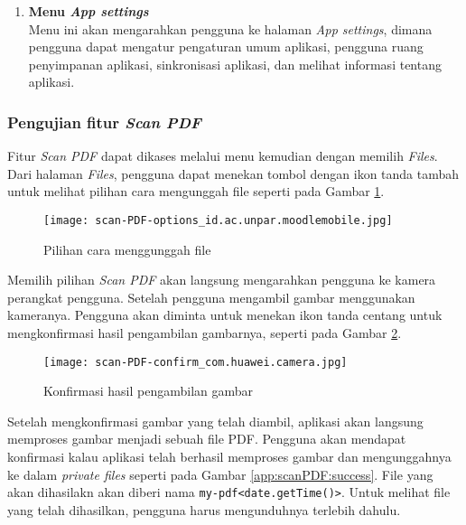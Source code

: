 \begin{enumerate}
\item \textbf{Menu \textit{App settings}} \\
Menu ini akan mengarahkan pengguna ke halaman \textit{App settings}, dimana pengguna dapat mengatur pengaturan umum aplikasi, pengguna ruang penyimpanan aplikasi, sinkronisasi aplikasi, dan melihat informasi tentang aplikasi.
\end{enumerate}


\subsubsection{Pengujian fitur \textit{Scan PDF}}

Fitur \textit{Scan PDF} dapat dikases melalui menu kemudian dengan memilih \textit{Files}. Dari halaman \textit{Files}, pengguna dapat menekan tombol dengan ikon tanda tambah untuk melihat pilihan cara mengunggah file seperti pada Gambar \ref{app:menu:files:options}. 

\begin{figure}[H] 
	\centering  
	\texttt{[image: scan-PDF-options\_id.ac.unpar.moodlemobile.jpg]}  
	\caption[Pilihan cara menggunggah file] {Pilihan cara menggunggah file} 
	\label{app:menu:files:options} 
\end{figure}  

Memilih pilihan \textit{Scan PDF} akan langsung mengarahkan pengguna ke kamera perangkat pengguna. Setelah pengguna mengambil gambar menggunakan kameranya. Pengguna akan diminta untuk menekan ikon tanda centang untuk mengkonfirmasi hasil pengambilan gambarnya, seperti pada Gambar \ref{app:scanPDF:confirm}.

\begin{figure}[H] 
	\centering  
	\texttt{[image: scan-PDF-confirm\_com.huawei.camera.jpg]}  
	\caption[Konfirmasi hasil pengambilan gambar] {Konfirmasi hasil pengambilan gambar} 
	\label{app:scanPDF:confirm} 
\end{figure}  

Setelah mengkonfirmasi gambar yang telah diambil, aplikasi akan langsung memproses gambar menjadi sebuah file PDF. Pengguna akan mendapat konfirmasi kalau aplikasi telah berhasil memproses gambar dan mengunggahnya ke dalam \textit{private files} seperti pada Gambar \ref{app:scanPDF:success}. File yang akan dihasilakn akan diberi nama \texttt{my-pdf<date.getTime()>}. Untuk melihat file yang telah dihasilkan, pengguna harus mengunduhnya terlebih dahulu.

